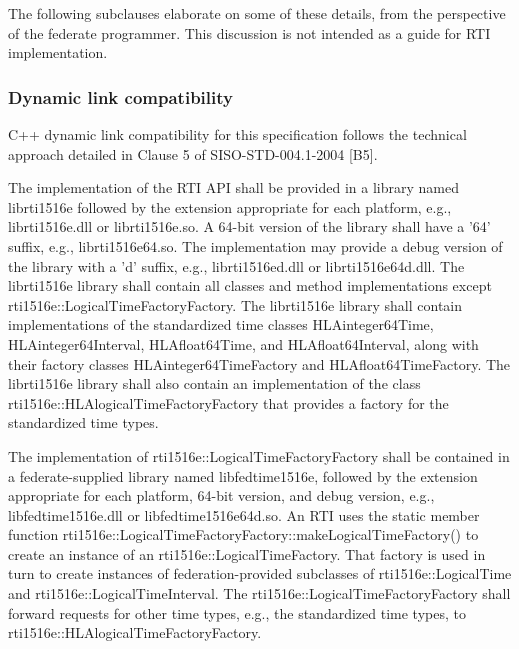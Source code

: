 \begin{compactstdpage}
    The following subclauses elaborate on some of these details, from the perspective of the federate programmer. This discussion is not intended as a guide for RTI implementation.

    \subsubsection{Dynamic link compatibility}

    C++ dynamic link compatibility for this specification follows the technical approach detailed in Clause 5 of SISO-STD-004.1-2004 [B5].

    The implementation of the RTI API shall be provided in a library named librti1516e followed by the extension appropriate for each platform, e.g., librti1516e.dll or librti1516e.so. A 64-bit version of the library shall have a '64' suffix, e.g., librti1516e64.so. The implementation may provide a debug version of the library with a 'd' suffix, e.g., librti1516ed.dll or librti1516e64d.dll. The librti1516e library shall contain all classes and method implementations except rti1516e::LogicalTimeFactoryFactory. The librti1516e library shall contain implementations of the standardized time classes HLAinteger64Time, HLAinteger64Interval, HLAfloat64Time, and HLAfloat64Interval, along with their factory classes HLAinteger64TimeFactory and HLAfloat64TimeFactory. The librti1516e library shall also contain an implementation of the class rti1516e::HLAlogicalTimeFactoryFactory that provides a factory for the standardized time types.

    The implementation of rti1516e::LogicalTimeFactoryFactory shall be contained in a federate-supplied library named libfedtime1516e, followed by the extension appropriate for each platform, 64-bit version, and debug version, e.g., libfedtime1516e.dll or libfedtime1516e64d.so. An RTI uses the static member function rti1516e::LogicalTimeFactoryFactory::\allowbreak{}makeLogicalTimeFactory() to create an instance of an rti1516e::LogicalTimeFactory. That factory is used in turn to create instances of federation-provided subclasses of rti1516e::LogicalTime and rti1516e::LogicalTimeInterval. The rti1516e::LogicalTimeFactoryFactory shall forward requests for other time types,    e.g.,   the standardized time types,   to rti1516e::HLAlogicalTimeFactoryFactory.


\end{compactstdpage}
